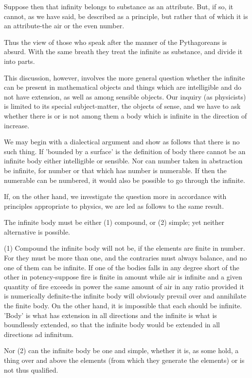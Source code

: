 Suppose then that infinity belongs to substance as an attribute. But,
if so, it cannot, as we have said, be described as a principle, but
rather that of which it is an attribute-the air or the even number.

Thus the view of those who speak after the manner of the Pythagoreans
is absurd. With the same breath they treat the infinite as substance,
and divide it into parts. 

This discussion, however, involves the more general question whether
the infinite can be present in mathematical objects and things which
are intelligible and do not have extension, as well as among sensible
objects. Our inquiry (as physicists) is limited to its special subject-matter,
the objects of sense, and we have to ask whether there is or is not
among them a body which is infinite in the direction of increase.

We may begin with a dialectical argument and show as follows that
there is no such thing. If 'bounded by a surface' is the definition
of body there cannot be an infinite body either intelligible or sensible.
Nor can number taken in abstraction be infinite, for number or that
which has number is numerable. If then the numerable can be numbered,
it would also be possible to go through the infinite. 

If, on the other hand, we investigate the question more in accordance
with principles appropriate to physics, we are led as follows to the
same result. 

The infinite body must be either (1) compound, or (2) simple; yet
neither alternative is possible. 

(1) Compound the infinite body will not be, if the elements are finite
in number. For they must be more than one, and the contraries must
always balance, and no one of them can be infinite. If one of the
bodies falls in any degree short of the other in potency-suppose fire
is finite in amount while air is infinite and a given quantity of
fire exceeds in power the same amount of air in any ratio provided
it is numerically definite-the infinite body will obviously prevail
over and annihilate the finite body. On the other hand, it is impossible
that each should be infinite. 'Body' is what has extension in all
directions and the infinite is what is boundlessly extended, so that
the infinite body would be extended in all directions ad infinitum.

Nor (2) can the infinite body be one and simple, whether it is, as
some hold, a thing over and above the elements (from which they generate
the elements) or is not thus qualified. 

